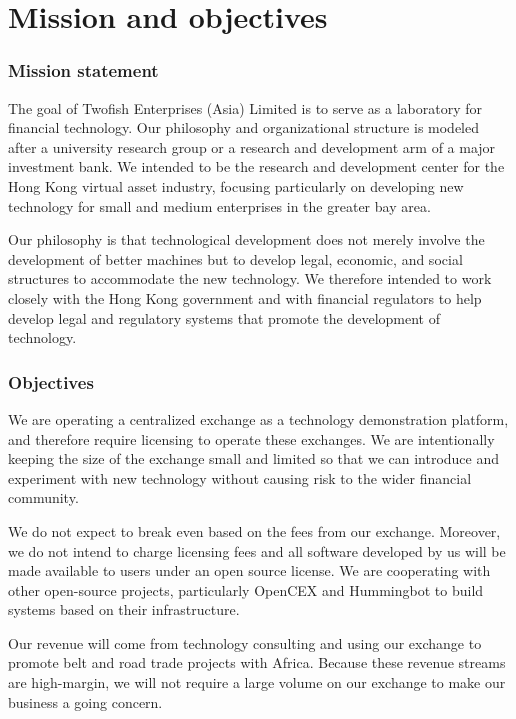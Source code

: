 \chapter{Mission and objectives}

\subsection{Mission statement}

The goal of Twofish Enterprises (Asia) Limited is to serve as
a laboratory for financial technology.  Our philosophy and
organizational structure is modeled after a university research
group or a research and development arm of a major investment bank.
We intended to be the research and development center for the Hong
Kong virtual asset industry, focusing particularly on developing new
technology for small and medium enterprises in the greater bay area.

Our philosophy is that technological development does not merely
involve the development of better machines but to develop legal,
economic, and social structures to accommodate the new technology.  We
therefore intended to work closely with the Hong Kong government and
with financial regulators to help develop legal and regulatory systems
that promote the development of technology.

\subsection{Objectives}
We are operating a centralized exchange as a technology demonstration
platform, and therefore require licensing to operate these exchanges.
We are intentionally keeping the size of the exchange small and
limited so that we can introduce and experiment with new technology
without causing risk to the wider financial community.

We do not expect to break even based on the fees from our exchange.
Moreover, we do not intend to charge licensing fees and all software
developed by us will be made available to users under an open source
license.  We are cooperating with other open-source projects,
particularly OpenCEX and Hummingbot to build systems based on their
infrastructure.

Our revenue will come from technology consulting and using our
exchange to promote belt and road trade projects with Africa.  Because
these revenue streams are high-margin, we will not require a large
volume on our exchange to make our business a going concern.


